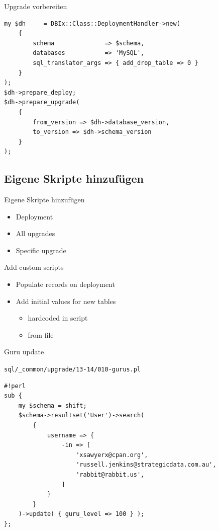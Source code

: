 \begin{frame}[fragile]{Upgrade vorbereiten}
\begin{lstlisting}
my $dh     = DBIx::Class::DeploymentHandler->new(
    {
        schema              => $schema,
        databases           => 'MySQL',
        sql_translator_args => { add_drop_table => 0 }
    }
);
$dh->prepare_deploy;
$dh->prepare_upgrade(
    {
        from_version => $dh->database_version,
        to_version => $dh->schema_version
    }
);
\end{lstlisting}
\end{frame}

\subsection{Eigene Skripte hinzufügen}

\begin{frame}{Eigene Skripte hinzufügen}
\begin{itemize}
\item Deployment
\item All upgrades
\item Specific upgrade
\end{itemize}
\end{frame}

\begin{frame}{Add custom scripts}
\begin{itemize}
\item Populate records on deployment
\item Add initial values for new tables
\begin{itemize}
\item hardcoded in script
\item from file
\end{itemize}
\end{itemize}
\end{frame}

\begin{frame}[fragile]{Guru update}

\verb|sql/_common/upgrade/13-14/010-gurus.pl|

\begin{lstlisting}
#!perl
sub {
    my $schema = shift;
    $schema->resultset('User')->search(
        {
            username => {
                -in => [
                    'xsawyerx@cpan.org',
                    'russell.jenkins@strategicdata.com.au',
                    'rabbit@rabbit.us',
                ]
            }
        }
    )->update( { guru_level => 100 } );
};

\end{lstlisting}
\end{frame}

